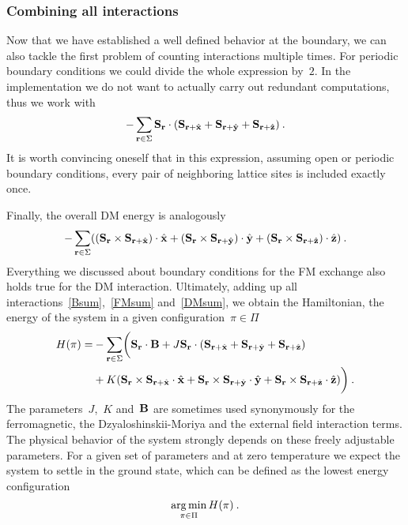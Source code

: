 \subsubsection{Combining all interactions}

Now that we have established a well defined behavior at the boundary, we can
also tackle the first problem of counting interactions multiple times. For
periodic boundary conditions we could divide the whole expression by~$2$. In the
implementation we do not want to actually carry out redundant computations, thus
we work with
%
\begin{equation}\label{FMsum}
  -\sum_{\mathbf{r} \in \Sigma} \mathbf{S}_{\mathbf{r}} \cdot
    (\mathbf{S}_{\mathbf{r} + \hat{\mathbf{x}}} + \mathbf{S}_{\mathbf{r} + \hat{\mathbf{y}}} + \mathbf{S}_{\mathbf{r} + \hat{\mathbf{z}}})\:.
\end{equation}
%
It is worth convincing oneself that in this expression, assuming open or
periodic boundary conditions, every pair of neighboring lattice sites is
included exactly once.

Finally, the overall DM energy is analogously
%
\begin{equation}\label{DMsum}
  -\sum_{\mathbf{r} \in \Sigma} ((\mathbf{S}_{\mathbf{r}} \times \mathbf{S}_{\mathbf{r} + \hat{\mathbf{x}}}) \cdot \hat{\mathbf{x}} +
    (\mathbf{S}_{\mathbf{r}} \times \mathbf{S}_{\mathbf{r} + \hat{\mathbf{y}}}) \cdot \hat{\mathbf{y}} +
    (\mathbf{S}_{\mathbf{r}} \times \mathbf{S}_{\mathbf{r} + \hat{\mathbf{z}}}) \cdot \hat{\mathbf{z}})\:.
\end{equation}
%
Everything we discussed about boundary conditions for the FM exchange also holds
true for the DM interaction. Ultimately, adding up all
interactions~\eqref{Bsum},~\eqref{FMsum} and~\eqref{DMsum}, we obtain the
Hamiltonian, \ie{} the energy of the system in a given configuration~$\pi \in
\Pi$
%
\begin{align}\label{hamiltonian}
  H(\pi) = &-\sum_{\mathbf{r} \in \Sigma}\biggl(\mathbf{S}_{\mathbf{r}} \cdot \mathbf{B} +
      J \mathbf{S}_{\mathbf{r}} \cdot (\mathbf{S}_{\mathbf{r}+\hat{\mathbf{x}}} + \mathbf{S}_{\mathbf{r}+\hat{\mathbf{y}}} + \mathbf{S}_{\mathbf{r}+\hat{\mathbf{z}}})\nonumber \\
      &+ K (\mathbf{S}_{\mathbf{r}} \times \mathbf{S}_{\mathbf{r}+\hat{\mathbf{x}}} \cdot \hat{\mathbf{x}} +
            \mathbf{S}_{\mathbf{r}} \times \mathbf{S}_{\mathbf{r}+\hat{\mathbf{y}}} \cdot \hat{\mathbf{y}} +
            \mathbf{S}_{\mathbf{r}} \times \mathbf{S}_{\mathbf{r}+\hat{\mathbf{z}}} \cdot \hat{\mathbf{z}})\biggr)\:.
\end{align}
%
The parameters~$J$,~$K$ and~$\mathbf{B}$ are sometimes used synonymously for the
ferromagnetic, the Dzyaloshinskii-Moriya and the external field interaction
terms. The physical behavior of the system strongly depends on these freely
adjustable parameters. For a given set of parameters and at zero temperature we
expect the system to settle in the ground state, which can be defined as the
lowest energy configuration
%
\begin{equation}\label{objective}
  \operatorname*{arg\,min}_{\pi \in \Pi} H(\pi)\:.
\end{equation}
%

